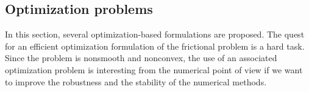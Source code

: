 {%



\subsection{Optimization problems}
\label{Sec:OptimisationProblems}

In this section, several optimization-based formulations are proposed. The quest for an efficient optimization formulation of the frictional problem is a hard task. Since the problem is nonsmooth and nonconvex, the use of an associated optimization problem is interesting from the numerical point of view if we want to improve the robustness and the stability of the numerical methods.


}
